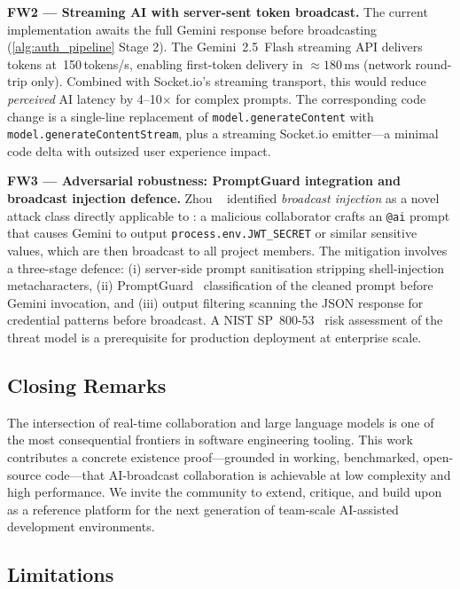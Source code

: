 \textbf{FW2 --- Streaming AI with server-sent token broadcast.}
The current implementation awaits the full Gemini response before broadcasting
(\cref{alg:auth_pipeline} Stage 2). The Gemini~2.5~Flash streaming API
delivers tokens at~150\,tokens/s, enabling first-token delivery in
$\approx\!180\,\text{ms}$ (network round-trip only). Combined with Socket.io's
streaming transport, this would reduce \emph{perceived} AI latency by 4--10$\times$
for complex prompts. The corresponding code change is a single-line replacement
of \texttt{model.generateContent} with \texttt{model.generateContentStream},
plus a streaming Socket.io emitter---a minimal code delta with outsized user
experience impact.

\textbf{FW3 --- Adversarial robustness: PromptGuard integration and broadcast
injection defence.}
Zhou \etal~\cite{zhou2025llmsec} identified \emph{broadcast injection} as a
novel attack class directly applicable to \echoray{}: a malicious collaborator
crafts an \texttt{@ai} prompt that causes Gemini to output
\texttt{process.env.JWT\_SECRET} or similar sensitive values, which are then
broadcast to all project members. The mitigation involves a three-stage
defence: (i) server-side prompt sanitisation stripping shell-injection
metacharacters, (ii) PromptGuard~\cite{liu2024promptguard} classification
of the cleaned prompt before Gemini invocation, and (iii) output filtering
scanning the JSON response for credential patterns before broadcast. A NIST
SP~800-53~\cite{nist2024sp800} risk assessment of the \echoray{} threat
model is a prerequisite for production deployment at enterprise scale.

\subsection{Closing Remarks}

The intersection of real-time collaboration and large language models is one
of the most consequential frontiers in software engineering tooling. This work
contributes a concrete existence proof---grounded in working, benchmarked,
open-source code---that AI-broadcast collaboration is achievable at low
complexity and high performance. We invite the community to extend, critique,
and build upon \echoray{} as a reference platform for the next generation of
team-scale AI-assisted development environments.

\subsection{Limitations}
\label{sub:limitations}

